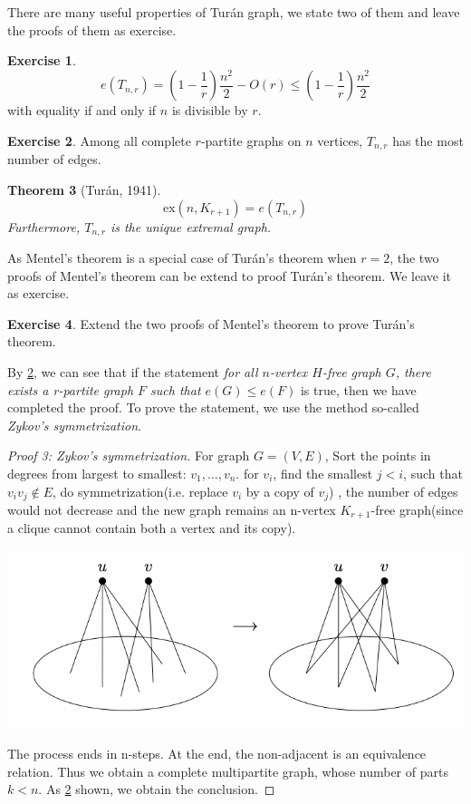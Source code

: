 \documentclass{article}
\newtheorem{theorem}{Theorem}[section]
\theoremstyle{definition}
\newtheorem{exercise}[theorem]{Exercise}
\newcommand{\ex}{\mathrm{ex}}
\def\Turan{Tur\'an}
\begin{document}
There are many useful properties of \Turan{} graph, we state two of them and leave the proofs of them as exercise.

\begin{exercise}
    $$ e(T_{n,r}) = (1-\frac{1}{r})\frac{n^2}{2}-O(r)
    \le (1-\frac{1}{r})\frac{n^2}{2}$$
    with equality if and only if $n$ is divisible by $r$.
\end{exercise}

\begin{exercise}\label{most number among CMG}
    Among all complete $r$-partite graphs on $n$ vertices, $T_{n,r}$ has the most number of edges.
\end{exercise}

\begin{theorem}[\Turan{}, 1941\cite{Turan1941Thm}]
    \label{TuranThm}
   $$\ex(n,K_{r+1})=e(T_{n,r})$$ 
    Furthermore, $T_{n,r}$ is the unique extremal graph.
\end{theorem}

As Mentel's theorem is a special case of \Turan{}'s theorem when $r=2$, the two proofs of Mentel's theorem can be extend to proof \Turan{}'s theorem. We leave it as exercise.

\begin{exercise}
   Extend the two proofs of Mentel's theorem to prove \Turan{}'s theorem.
\end{exercise}

By \ref{most number among CMG}, we can see that if the statement \emph{for all $n$-vertex $H$-free graph $G$, there exists a r-partite graph $F$ such that $e(G)\le e(F)$} is true, then we have completed the proof. To prove the statement, we use the method so-called \emph{Zykov's symmetrization}.

\begin{proof}[Proof 3: Zykov's symmetrization]
    For graph $G=(V,E)$, Sort the points in degrees from largest to smallest: $v_1,\ldots,v_n$.
    for $v_i$, find the smallest $j<i$, such that $v_iv_j \notin E$, do symmetrization(i.e. replace $v_i$ by a copy of $v_j$) , the number of edges would not decrease and the new graph remains an n-vertex $K_{r+1}$-free graph(since a clique cannot contain both a vertex and its copy). 
\begin{center}
    \includegraphics[scale=0.9]{2-3.png}
\end{center}
    The process ends in n-steps. At the end, the non-adjacent is an equivalence relation. Thus we obtain a complete multipartite graph, whose number of parts $k<n$. As \ref{most number among CMG} shown, we obtain the conclusion.
\end{proof}
\end{document}
